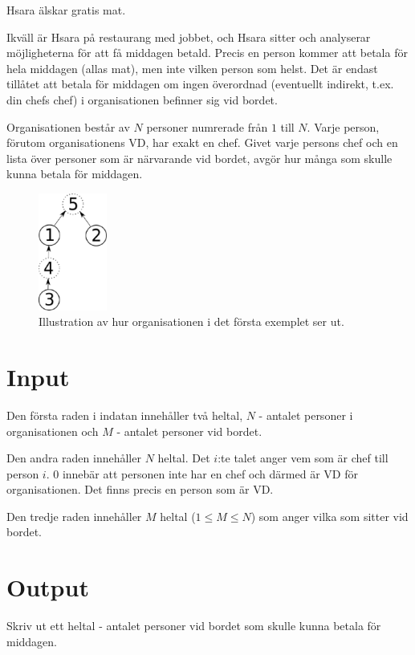 Hsara älskar gratis mat.

Ikväll är Hsara på restaurang med jobbet, och Hsara sitter och analyserar möjligheterna för att få middagen betald. Precis en person kommer att betala för hela middagen (allas mat), men inte vilken person som helst. Det är endast tillåtet att betala för middagen om ingen överordnad (eventuellt indirekt, t.ex. din chefs chef) i organisationen befinner sig vid bordet.

Organisationen består av $N$ personer numrerade från $1$ till $N$. Varje person, förutom organisationens VD, har exakt en chef. Givet varje persons chef och en lista över personer som är närvarande vid bordet, avgör hur många som skulle kunna betala för middagen.

\begin{figure}[h!]
	\begin{center}
		\includegraphics[width=0.2\textwidth]{tree.eps}
		\caption{Illustration av hur organisationen i det första exemplet ser ut.}
	\end{center}
\end{figure}

\section*{Input}
Den första raden i indatan innehåller två heltal, $N$ - antalet personer i organisationen och $M$ - antalet personer vid bordet.

Den andra raden innehåller $N$ heltal. Det $i$:te talet anger vem som är chef till person $i$. 0 innebär att personen inte har en chef och därmed är VD för organisationen. Det finns precis en person som är VD.

Den tredje raden innehåller $M$ heltal ($1 \le M \le N$) som anger vilka som sitter vid bordet.

\section*{Output}
Skriv ut ett heltal - antalet personer vid bordet som skulle kunna betala för middagen.

